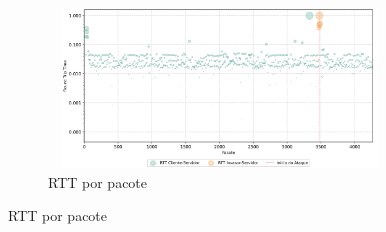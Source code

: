 \begin{apendicesenv}
\begin{figure}[htbp!]
\begin{subfigure}[t]{0.5\textwidth}
        \centering
        \caption{RTT por pacote}
        \includegraphics[width=1\textwidth, height=120pt]{USPSC-img/output/cropped/1-dos_certificate_inf_chain_loop-rttp.png}
    \end{subfigure}%
\end{figure}


\end{apendicesenv}
